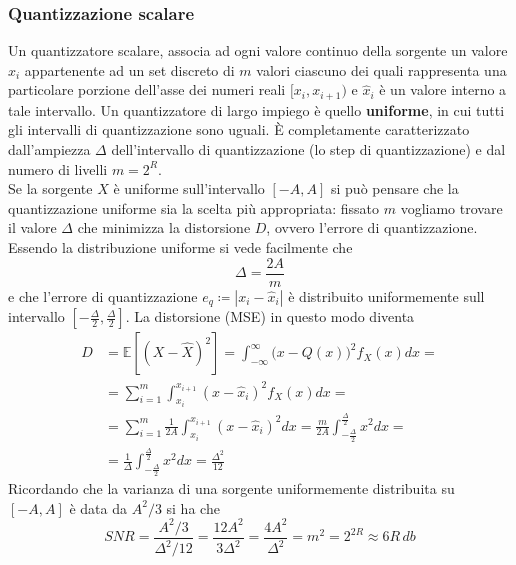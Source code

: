 \subsubsection{Quantizzazione scalare}
Un quantizzatore scalare, associa ad ogni valore continuo della sorgente un valore $\hat{x}_i$ appartenente ad un set discreto di $m$ valori ciascuno dei quali rappresenta una particolare porzione dell’asse dei numeri reali $[x_i, x_{i+1})$ e $\hat{x}_i$ \`e un valore interno a tale intervallo. Un quantizzatore di largo impiego è quello \textbf{uniforme}, in cui tutti gli intervalli di
quantizzazione sono uguali. È completamente caratterizzato dall'ampiezza $\Delta$ dell'intervallo di quantizzazione (lo step di quantizzazione) e dal numero di livelli $m=2^R$.\\
Se la sorgente $X$ \`e uniforme sull'intervallo $[-A, A]$ si pu\`o pensare che la quantizzazione uniforme sia la scelta pi\`u appropriata: fissato $m$ vogliamo trovare il valore $\Delta$ che minimizza la distorsione $D$, ovvero l'errore di quantizzazione. Essendo la distribuzione uniforme si vede facilmente che 
\begin{equation}
    \Delta = \frac{2A}{m}
\end{equation}
e che l'errore di quantizzazione $e_q \coloneqq |x_i - \hat{x}_i|$ \`e distribuito uniformemente sull intervallo $[-\frac{\Delta}{2}, \frac{\Delta}{2}]$. La distorsione (MSE) in questo modo diventa
\begin{align*}
    D &= \mathbb{E} [ (X - \hat{X})^2] = \int_{-\infty}^{\infty} \Big ( x - Q(x) \Big )^2 f_X(x)dx = \\
    &= \sum_{i=1}^m \int_{x_i}^{x_{i+1}} (x - \hat{x}_i)^2 f_X(x) dx = \\
    &= \sum_{i=1}^m \frac{1}{2A} \int_{x_i}^{x_{i+1}} (x - \hat{x}_i)^2 dx = \frac{m}{2A} \int_{-\frac{\Delta}{2}}^{\frac{\Delta}{2}} x^2 dx = \\
    &= \frac{1}{\Delta} \int_{-\frac{\Delta}{2}}^{\frac{\Delta}{2}} x^2 dx = \frac{\Delta^2}{12}
\end{align*}
Ricordando che la varianza di una sorgente uniformemente distribuita su $[-A, A]$ \`e data da $A^2/3$ si ha che
\begin{equation}
    SNR = \frac{A^2/3}{\Delta^2/12} = \frac{12A^2}{3\Delta^2} = \frac{4A^2}{\Delta^2} = m^2 = 2^{2R} \approx 6R \hspace{2pt} db
\end{equation}

